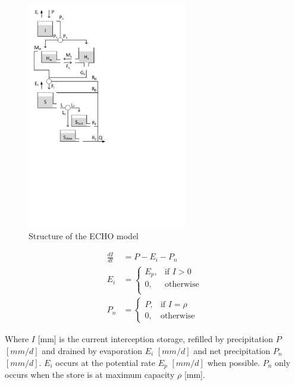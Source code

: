 { 																	%
\begin{figure}
\includegraphics[trim=1cm 11cm 7cm 1cm,width=7cm,keepaspectratio]{./files/44_schematic.pdf}
\caption{Structure of the ECHO model} \label{fig:44_schematic}
\end{figure}

\begin{align}
	\frac{dI}{dt} &= P-E_i-P_n \\
	E_i &= \begin{cases}
		E_p, &\text{if } I >0 \\
		0, & \text{otherwise} \\
	\end{cases} \\
	P_n &= 
	\begin{cases}
		P, & \text{if } I = \rho \\
		0, & \text{otherwise}
	\end{cases}
\end{align}

Where $I$ [mm] is the current interception storage, refilled by precipitation $P$ $[mm/d]$ and drained by evaporation $E_i$ $[mm/d]$ and net precipitation $P_n$ $[mm/d]$.
$E_i$ occurs at the potential rate $E_p$ $[mm/d]$ when possible. 
$P_n$ only occurs when the store is at maximum capacity $\rho$ [mm].

} %

